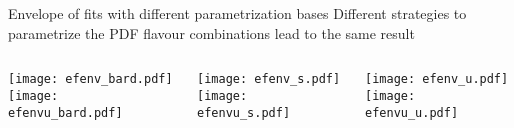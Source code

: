 \begin{frame}{Envelope of fits with different parametrization bases}
    Different strategies to parametrize the PDF flavour combinations lead to the same result
    \vspace*{-1em}
    \begin{columns}
        \begin{column}[T]{0.32\textwidth}
          \begin{center}
              \texttt{[image: efenv\_bard.pdf]} \\
              \texttt{[image: efenvu\_bard.pdf]} 
          \end{center}
        \end{column}
        \begin{column}[t]{0.32\textwidth}
          \begin{center}
              \texttt{[image: efenv\_s.pdf]} \\
              \texttt{[image: efenvu\_s.pdf]} 
          \end{center}
        \end{column}
        \begin{column}[t]{0.32\textwidth}
            \begin{center}
                \texttt{[image: efenv\_u.pdf]} \\
                \texttt{[image: efenvu\_u.pdf]} 
            \end{center}
          \end{column}
    \end{columns}

\end{frame}
